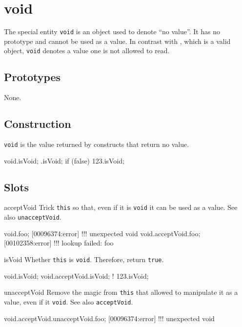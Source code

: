 \section{void}

The special entity \lstinline|void| is an object used to denote ``no
value''.  It has no prototype and cannot be used as a value.  In
contrast with , which is a valid object,
\lstinline|void| denotes a value one is not allowed to read.

\subsection{Prototypes}

None.

\subsection{Construction}

\lstinline|void| is the value returned by constructs that return no
value.

\begin{urbiassert}[firstnumber=1]
void.isVoid;
{}.isVoid;
{if (false) 123}.isVoid;
\end{urbiassert}

\subsection{Slots}

\begin{urbiscriptapi}
\item[acceptVoid]
  Trick \lstinline|this| so that, even if it is \lstinline|void| it
  can be used as a value.  See also \lstinline|unacceptVoid|.
\begin{urbiscript}
void.foo;
[00096374:error] !!! unexpected void
void.acceptVoid.foo;
[00102358:error] !!! lookup failed: foo
\end{urbiscript}

\item[isVoid]
  Whether \lstinline|this| is \lstinline|void|.  Therefore, return
  \lstinline|true|.
\begin{urbiassert}
void.isVoid;
void.acceptVoid.isVoid;
! 123.isVoid;
\end{urbiassert}

\item[unacceptVoid]
  Remove the magic from \lstinline|this| that allowed to manipulate it
  as a value, even if it \lstinline|void|.  See also
  \lstinline|acceptVoid|.
\begin{urbiscript}
void.acceptVoid.unacceptVoid.foo;
[00096374:error] !!! unexpected void
\end{urbiscript}

\end{urbiscriptapi}




